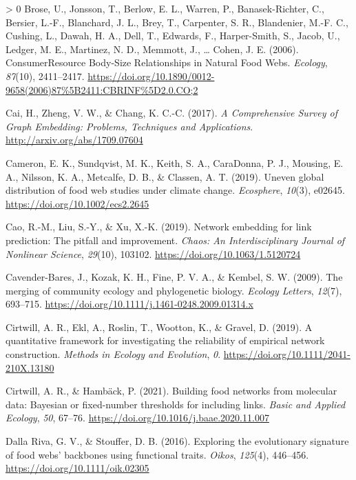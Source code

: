 \documentclass[10pt,oneside]{article}
\newlength{\cslhangindent}
\newenvironment{CSLReferences}[3] %
 {%
  \setlength{\parindent}{0pt}
  \ifodd #1 \everypar{\setlength{\hangindent}{\cslhangindent}}\ignorespaces\fi
  \ifnum #2 > 0
  \setlength{\parskip}{#2\baselineskip}
  \fi
 }%
 {}
\begin{document}
\begin{CSLReferences}{1}{0}
\leavevmode\hypertarget{ref-Brose2006ConRes}{}%
Brose, U., Jonsson, T., Berlow, E. L., Warren, P., Banasek-Richter, C.,
Bersier, L.-F., Blanchard, J. L., Brey, T., Carpenter, S. R.,
Blandenier, M.-F. C., Cushing, L., Dawah, H. A., Dell, T., Edwards, F.,
Harper-Smith, S., Jacob, U., Ledger, M. E., Martinez, N. D., Memmott,
J., \ldots{} Cohen, J. E. (2006). ConsumerResource Body-Size
Relationships in Natural Food Webs. \emph{Ecology}, \emph{87}(10),
2411--2417.
\url{https://doi.org/10.1890/0012-9658(2006)87\%5B2411:CBRINF\%5D2.0.CO;2}

\leavevmode\hypertarget{ref-Cai2017ComSur}{}%
Cai, H., Zheng, V. W., \& Chang, K. C.-C. (2017). \emph{A Comprehensive
Survey of Graph Embedding: Problems, Techniques and Applications}.
\url{http://arxiv.org/abs/1709.07604}

\leavevmode\hypertarget{ref-Cameron2019UneGlo}{}%
Cameron, E. K., Sundqvist, M. K., Keith, S. A., CaraDonna, P. J.,
Mousing, E. A., Nilsson, K. A., Metcalfe, D. B., \& Classen, A. T.
(2019). Uneven global distribution of food web studies under climate
change. \emph{Ecosphere}, \emph{10}(3), e02645.
\url{https://doi.org/10.1002/ecs2.2645}

\leavevmode\hypertarget{ref-Cao2019NetEmb}{}%
Cao, R.-M., Liu, S.-Y., \& Xu, X.-K. (2019). Network embedding for link
prediction: The pitfall and improvement. \emph{Chaos: An
Interdisciplinary Journal of Nonlinear Science}, \emph{29}(10), 103102.
\url{https://doi.org/10.1063/1.5120724}

\leavevmode\hypertarget{ref-Cavender-Bares2009MerCom}{}%
Cavender-Bares, J., Kozak, K. H., Fine, P. V. A., \& Kembel, S. W.
(2009). The merging of community ecology and phylogenetic biology.
\emph{Ecology Letters}, \emph{12}(7), 693--715.
\url{https://doi.org/10.1111/j.1461-0248.2009.01314.x}

\leavevmode\hypertarget{ref-Cirtwill2019QuaFra}{}%
Cirtwill, A. R., Ekl, A., Roslin, T., Wootton, K., \& Gravel, D. (2019).
A quantitative framework for investigating the reliability of empirical
network construction. \emph{Methods in Ecology and Evolution}, \emph{0}.
\url{https://doi.org/10.1111/2041-210X.13180}

\leavevmode\hypertarget{ref-Cirtwill2021BuiFoo}{}%
Cirtwill, A. R., \& Hambäck, P. (2021). Building food networks from
molecular data: Bayesian or fixed-number thresholds for including links.
\emph{Basic and Applied Ecology}, \emph{50}, 67--76.
\url{https://doi.org/10.1016/j.baae.2020.11.007}

\leavevmode\hypertarget{ref-DallaRiva2016ExpEvo}{}%
Dalla Riva, G. V., \& Stouffer, D. B. (2016). Exploring the evolutionary
signature of food webs' backbones using functional traits. \emph{Oikos},
\emph{125}(4), 446--456. \url{https://doi.org/10.1111/oik.02305}


\end{CSLReferences}
\end{document}
